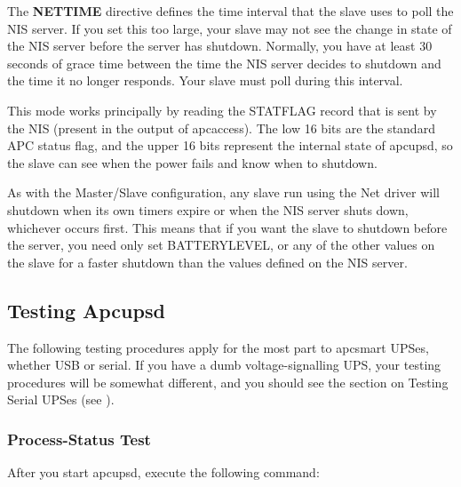 {The {\bf NETTIME} directive defines the time interval that the slave uses to
poll the NIS server. If you set this too large, your slave may not see the
change in state of the NIS server before the server has shutdown. Normally,
you have at least 30 seconds of grace time between the time the NIS server
decides to shutdown and the time it no longer responds. Your slave must poll
during this interval.  

This mode works principally by reading the STATFLAG record that is sent by the
NIS (present in the output of apcaccess). The low 16 bits are the standard APC
status flag, and the upper 16 bits represent the internal state of apcupsd, so
the slave can see when the power fails and know when to shutdown.  

As with the Master/Slave configuration, any slave run using the Net driver
will shutdown when its own timers expire or when the NIS server shuts down,
whichever occurs first. This means that if you want the slave to shutdown
before the server, you need only set BATTERYLEVEL, or any of the other values
on the slave for a faster shutdown than the values defined on the NIS server. 

\label{Testing-Apcupsd}

\subsection*{Testing Apcupsd}

\label{index-Testing-84}
The following testing procedures apply for the most part to apcsmart UPSes,
whether USB or serial.  If you have a dumb voltage-signalling UPS, your
testing procedures will be somewhat different, and you should see the section
on Testing Serial UPSes (see 
). 

\label{Process_002dStatus-Test}

\subsubsection*{Process-Status Test}

\label{index-Process-Status-Testing-85}
\label{index-Testing_002c-Process-Status-86}
After you start apcupsd, execute the following command: 

}
